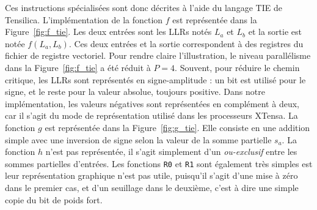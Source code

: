 Ces instructions spécialisées sont donc décrites à l'aide du langage TIE de Tensilica.
L'implémentation de la fonction $f$ est représentée dans la Figure~\ref{fig:f_tie}. Les deux entrées sont les LLRs notés $L_a$ et $L_b$ et la sortie est notée $f(L_a,L_b)$. Ces deux entrées et la sortie correspondent à des registres du fichier de registre vectoriel. Pour rendre claire l'illustration, le niveau parallélisme dans la Figure~\ref{fig:f_tie} a été réduit à $P=4$. Souvent, pour réduire le chemin critique, les LLRs sont représentés en \og signe-amplitude \fg : un bit est utilisé pour le signe, et le reste pour la valeur absolue, toujours positive. Dans notre implémentation, les valeurs négatives sont représentées en complément à deux, car il s'agit du mode de représentation utilisé dans les processeurs XTensa.
La fonction $g$ est représentée dans la Figure~\ref{fig:g_tie}. Elle consiste en une addition simple avec une inversion de signe selon la valeur de la somme partielle $s_a$.
La fonction $h$ n'est pas représentée, il s'agit simplement d'un \textit{ou-exclusif} entre les sommes partielles d'entrées. Les fonctions \texttt{R0} et \texttt{R1} sont également très simples est leur représentation graphique n'est pas utile, puisqu'il s'agit d'une mise à zéro dans le premier cas, et d'un seuillage dans le deuxième, c'est à dire une simple copie du bit de poids fort.
